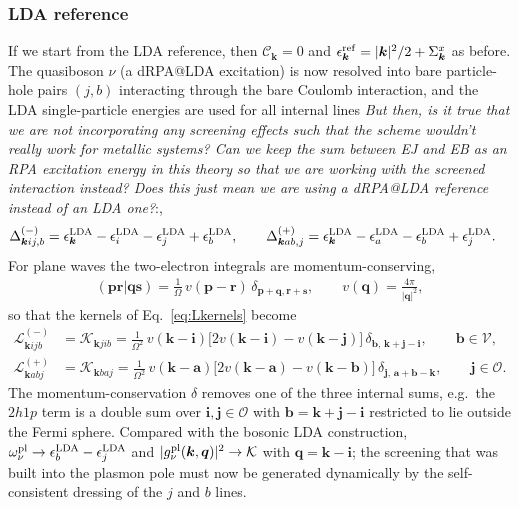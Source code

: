 \subsubsection{LDA reference}
If we start from the LDA reference, then $\mathcal{C}_{\bm{k}}=0$ and $\epsilon^{\rm ref}_{\bm{k}}=|\bm{k}|^2/2+\Sigma^x_{\bm{k}}$ as before. The quasiboson $\nu$ (a dRPA@LDA excitation) is now resolved into bare particle-hole pairs $(j,b)$ interacting through the bare Coulomb interaction, and the LDA single-particle energies are used for all internal lines \emph{But then, is it true that we are not incorporating any screening effects such that the scheme wouldn't really work for metallic systems? Can we keep the sum between EJ and EB as an RPA excitation energy in this theory so that we are working with the screened interaction instead? Does this just mean we are using a dRPA@LDA reference instead of an LDA one?}:,
\begin{align}
\Delta^{(-)}_{\bm{k}ij,b}
&=
\epsilon^{\rm LDA}_{\bm{k}}
-\epsilon^{\rm LDA}_{i}
-\epsilon^{\rm LDA}_{j}
+\epsilon^{\rm LDA}_{b},
\qquad
\Delta^{(+)}_{\bm{k}ab,j}
=
\epsilon^{\rm LDA}_{\bm{k}}
-\epsilon^{\rm LDA}_{a}
-\epsilon^{\rm LDA}_{b}
+\epsilon^{\rm LDA}_{j}.
\end{align}
For plane waves the two-electron integrals are momentum-conserving,
\begin{align}
(\bm{p}\bm{r}|\bm{q}\bm{s})
=
\frac{1}{\Omega}\,v(\bm{p}-\bm{r})\,\delta_{\bm{p}+\bm{q},\bm{r}+\bm{s}},
\qquad
v(\bm{q})=\frac{4\pi}{|\bm{q}|^2},
\end{align}
so that the kernels of Eq.~\eqref{eq:Lkernels} become
\begin{align}
\mathcal{L}^{(-)}_{\bm{k}ijb}
&=
\mathcal{K}_{\bm{k}jib}
=
\frac{1}{\Omega^2}\,
v(\bm{k}-\bm{i})\big[2v(\bm{k}-\bm{i})-v(\bm{k}-\bm{j})\big]\,
\delta_{\bm{b},\,\bm{k}+\bm{j}-\bm{i}},
\qquad \bm{b}\in\mathcal{V},
\\
\mathcal{L}^{(+)}_{\bm{k}abj}
&=
\mathcal{K}_{\bm{k}baj}
=
\frac{1}{\Omega^2}\,
v(\bm{k}-\bm{a})\big[2v(\bm{k}-\bm{a})-v(\bm{k}-\bm{b})\big]\,
\delta_{\bm{j},\,\bm{a}+\bm{b}-\bm{k}},
\qquad \bm{j}\in\mathcal{O}.
\end{align}
The momentum-conservation $\delta$ removes one of the three internal sums, e.g.\ the $2h1p$ term is a double sum over $\bm{i},\bm{j}\in\mathcal{O}$ with $\bm{b}=\bm{k}+\bm{j}-\bm{i}$ restricted to lie outside the Fermi sphere. Compared with the bosonic LDA construction, $\omega^{\rm pl}_\nu\to\epsilon^{\rm LDA}_b-\epsilon^{\rm LDA}_j$ and $|g^{\rm pl}_\nu(\bm{k},\bm{q})|^2\to\mathcal{K}$ with $\bm{q}=\bm{k}-\bm{i}$; the screening that was built into the plasmon pole must now be generated dynamically by the self-consistent dressing of the $j$ and $b$ lines.

